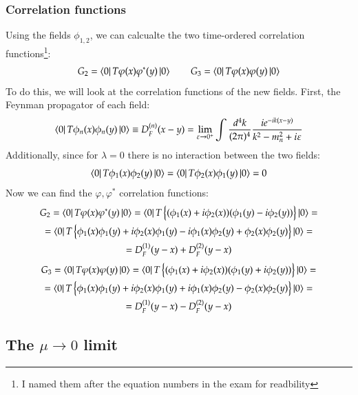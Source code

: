 \documentclass{article}
\begin{document}
\subsubsection{Correlation functions}
Using the fields $\phi_{1,2}$, we can calcualte the two time-ordered correlation functions\footnote{I named them after the equation numbers in the exam for readbility}:
\begin{equation}
    G_2 = \bra{0}T\varphi(x)\varphi^*(y)\ket{0}
    \qquad
    G_3 = \bra{0}T\varphi(x)\varphi(y)\ket{0}
\end{equation}
To do this, we will look at the correlation functions of the new fields. First, the Feynman propagator of each field:
\begin{equation}
    \bra{0}T\phi_n(x)\phi_n(y)\ket{0} \equiv D_F^{(n)}(x - y) = \lim_{\varepsilon \rightarrow 0^{+}}\int \frac{d^4k}{(2\pi)^4}\frac{ie^{-ik(x-y)}}{k^2 - m_n^2 + i\varepsilon}
\end{equation}
Additionally, since for $\lambda = 0$ there is no interaction between the two fields:
\begin{equation}
    \bra{0}T\phi_1(x)\phi_2(y)\ket{0} = \bra{0}T\phi_2(x)\phi_1(y)\ket{0} = 0
\end{equation}
Now we can find the $\varphi, \varphi^*$ correlation functions:
\begin{equation}
\begin{gathered}
    G_2 = \bra{0}T\varphi(x)\varphi^*(y)\ket{0} =
    \bra{0}T\left\{(\phi_1(x) + i\phi_2(x))(\phi_1(y) - i\phi_2(y))\right\}\ket{0} = \\ =
    \bra{0}T\left\{\phi_1(x)\phi_1(y) + i\phi_2(x)\phi_1(y) - i\phi_1(x)\phi_2(y) + \phi_2(x)\phi_2(y)\right\}\ket{0} = \\ =
    D_F^{(1)}(y - x) + D_F^{(2)}(y - x)
\end{gathered}
\end{equation}
\begin{equation}
\begin{gathered}
    G_3 = \bra{0}T\varphi(x)\varphi(y)\ket{0} =
    \bra{0}T\left\{(\phi_1(x) + i\phi_2(x))(\phi_1(y) + i\phi_2(y))\right\}\ket{0} = \\ =
    \bra{0}T\left\{\phi_1(x)\phi_1(y) + i\phi_2(x)\phi_1(y) + i\phi_1(x)\phi_2(y) - \phi_2(x)\phi_2(y)\right\}\ket{0} = \\ =
    D_F^{(1)}(y - x) - D_F^{(2)}(y - x)
\end{gathered}
\end{equation}
\subsection{The $\mu \rightarrow 0$ limit}
\end{document}
